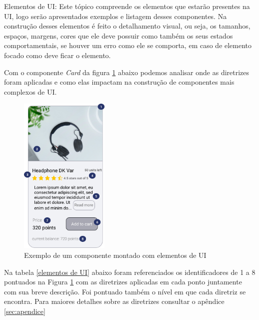 {\newpage
Elementos de UI: Este tópico compreende os elementos que estarão presentes na UI, logo serão apresentados exemplos e listagem desses componentes. Na construção desses elementos é feito o detalhamento visual, ou seja, os tamanhos, espaços, margens, cores que ele deve possuir como também os seus estados comportamentais, se houver um erro como ele se comporta, em caso de elemento focado como deve ficar o elemento.


Com o componente \textit{Card} da figura \ref{fig:UI_componentes} abaixo podemos analisar onde as diretrizes foram aplicadas e como elas impactam na construção de componentes mais complexos de UI. 

\begin{figure}[ht]
        \centering
    	\includegraphics[width=0.38\textwidth]{images/ui-exemplo.png}
        \caption{Exemplo de um componente montado com elementos de UI}
        \label{fig:UI_componentes}
\end{figure}

Na tabela \ref{elementos de UI} abaixo foram referenciados os identificadores de 1 a 8 pontuados na Figura \ref{fig:UI_componentes} com as diretrizes aplicadas em cada ponto juntamente com sua breve descrição. Foi pontuado também o nível em que cada diretriz se encontra. Para maiores detalhes sobre as diretrizes consultar o apêndice \ref{sec:apendice}
{


}}
